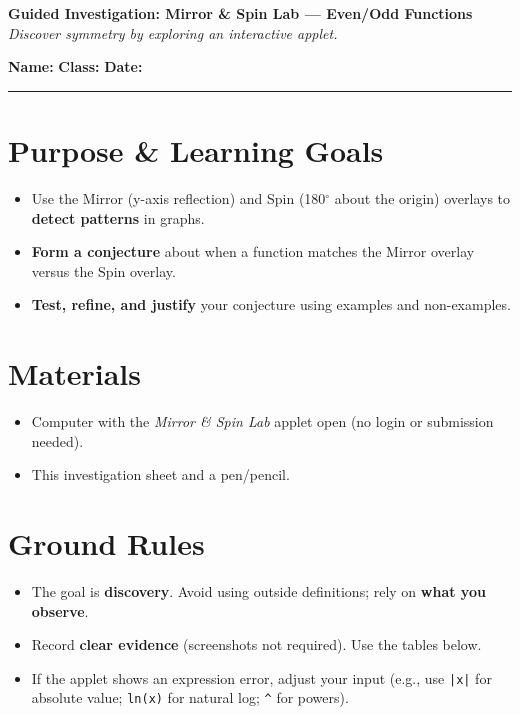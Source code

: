 \documentclass[11pt]{article}
\newcommand{\ruleline}{\par\noindent\rule{\textwidth}{0.4pt}\par}
\newcommand{\blank}[1]{\makebox[#1]{\hrulefill}}
\begin{document}
\begin{center}
{\LARGE \textbf{Guided Investigation: Mirror \& Spin Lab — Even/Odd Functions}}\\[4pt]
\textit{Discover symmetry by exploring an interactive applet.}
\end{center}

\vspace{0.5em}
\noindent \textbf{Name:} \blank{2.5in} \hfill \textbf{Class:} \blank{1.5in} \hfill \textbf{Date:} \blank{1.0in}

\ruleline

\section*{Purpose \& Learning Goals}
\begin{itemize}
  \item Use the Mirror (y-axis reflection) and Spin (180$^\circ$ about the origin) overlays to \textbf{detect patterns} in graphs.
  \item \textbf{Form a conjecture} about when a function matches the Mirror overlay versus the Spin overlay.
  \item \textbf{Test, refine, and justify} your conjecture using examples and non-examples.
\end{itemize}

\section*{Materials}
\begin{itemize}
  \item Computer with the \textit{Mirror \& Spin Lab} applet open (no login or submission needed).
  \item This investigation sheet and a pen/pencil.
\end{itemize}

\section*{Ground Rules}
\begin{itemize}
  \item The goal is \textbf{discovery}. Avoid using outside definitions; rely on \textbf{what you observe}.
  \item Record \textbf{clear evidence} (screenshots not required). Use the tables below.
  \item If the applet shows an expression error, adjust your input (e.g., use \texttt{|x|} for absolute value; \texttt{ln(x)} for natural log; \verb|^| for powers).
\end{itemize}
\end{document}
